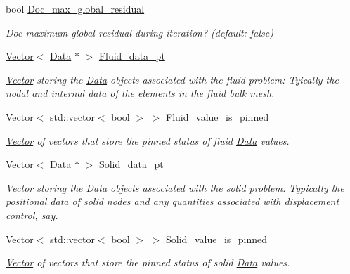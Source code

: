 \begin{DoxyCompactItemize}
bool \hyperlink{classoomph_1_1SegregatableFSIProblem_aadc0d46511ee90dad36d0d00a8c2d7ad}{Doc\+\_\+max\+\_\+global\+\_\+residual}
\begin{DoxyCompactList}\small\item\em Doc maximum global residual during iteration? (default\+: false) \end{DoxyCompactList}\item 
\hyperlink{classoomph_1_1Vector}{Vector}$<$ \hyperlink{classoomph_1_1Data}{Data} $\ast$ $>$ \hyperlink{classoomph_1_1SegregatableFSIProblem_a1aac015f9f0e9c1b925a534278dc1e55}{Fluid\+\_\+data\+\_\+pt}
\begin{DoxyCompactList}\small\item\em \hyperlink{classoomph_1_1Vector}{Vector} storing the \hyperlink{classoomph_1_1Data}{Data} objects associated with the fluid problem\+: Tyically the nodal and internal data of the elements in the fluid bulk mesh. \end{DoxyCompactList}\item 
\hyperlink{classoomph_1_1Vector}{Vector}$<$ std\+::vector$<$ bool $>$ $>$ \hyperlink{classoomph_1_1SegregatableFSIProblem_aa39b7f8499588b28b9b490771c4bcff2}{Fluid\+\_\+value\+\_\+is\+\_\+pinned}
\begin{DoxyCompactList}\small\item\em \hyperlink{classoomph_1_1Vector}{Vector} of vectors that store the pinned status of fluid \hyperlink{classoomph_1_1Data}{Data} values. \end{DoxyCompactList}\item 
\hyperlink{classoomph_1_1Vector}{Vector}$<$ \hyperlink{classoomph_1_1Data}{Data} $\ast$ $>$ \hyperlink{classoomph_1_1SegregatableFSIProblem_aca9ab5f800334761ae470453ef476067}{Solid\+\_\+data\+\_\+pt}
\begin{DoxyCompactList}\small\item\em \hyperlink{classoomph_1_1Vector}{Vector} storing the \hyperlink{classoomph_1_1Data}{Data} objects associated with the solid problem\+: Typically the positional data of solid nodes and any quantities associated with displacement control, say. \end{DoxyCompactList}\item 
\hyperlink{classoomph_1_1Vector}{Vector}$<$ std\+::vector$<$ bool $>$ $>$ \hyperlink{classoomph_1_1SegregatableFSIProblem_a0f5d6ec62fd33f83600b69c9fcb1f4ed}{Solid\+\_\+value\+\_\+is\+\_\+pinned}
\begin{DoxyCompactList}\small\item\em \hyperlink{classoomph_1_1Vector}{Vector} of vectors that store the pinned status of solid \hyperlink{classoomph_1_1Data}{Data} values. \end{DoxyCompactList}\item 

\end{DoxyCompactItemize}
